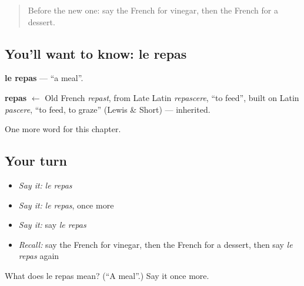 \label{lesson:FR-C122-repas}



\begin{quote}
Before the new one: say the French for vinegar, then the French for a dessert.
\end{quote}

\subsection*{You'll want to know: le repas}
\textbf{le repas} — \textquotedblleft{}a meal\textquotedblright{}.

\begin{cousinweb}
\textbf{repas} $\leftarrow$ Old French \emph{repast}, from Late Latin \emph{repascere}, \textquotedblleft{}to feed\textquotedblright{}, built on Latin \emph{pascere}, \textquotedblleft{}to feed, to graze\textquotedblright{} (Lewis \& Short) — inherited.
\end{cousinweb}

\begin{grammarlens}[title={What you've built}]
One more word for this chapter.
\end{grammarlens}

\subsection*{Your turn}
\begin{itemize}
\raggedright
  \item \emph{Say it:} \emph{le repas}
  \item \emph{Say it:} \emph{le repas}, once more
  \item \emph{Say it:} say \emph{le repas}
  \item \emph{Recall:} say the French for vinegar, then the French for a dessert, then say \emph{le repas} again
\end{itemize}

\begin{tcolorbox}[breakable,colback=teal!4,colframe=teal!35!black,title={Before you move on}]
What does le repas mean? (\textquotedblleft{}A meal\textquotedblright{}.) Say it once more.
\end{tcolorbox}
